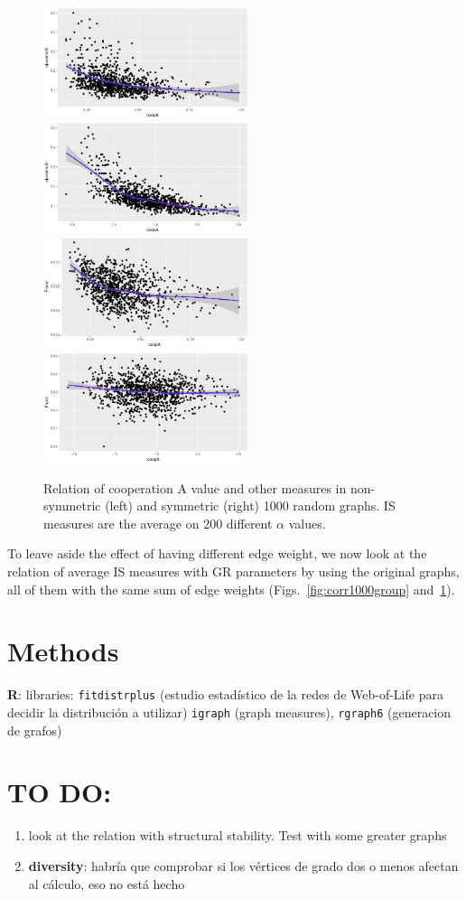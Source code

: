 \documentclass{article}
\begin{document}
\begin{figure}[htbp!]
  \includegraphics[width=6cm]{img/rel1000groupCoopDiam}\quad\quad
  \includegraphics[width=6cm]{img/relS1000groupCoopDiam}\\
  \includegraphics[width=6cm]{img/rel1000groupCoopFrond}\quad\quad
  \includegraphics[width=6cm]{img/relS1000groupCoopFrond}
  \caption{Relation of cooperation A value and other measures in
    non-symmetric (left) and symmetric (right) 1000 random graphs. IS
    measures are the average on 200 different $\alpha$ values.}
  \label{fig:coopAndISGR1000}
\end{figure}

To leave aside the effect of having different edge weight, we now look
at the relation of average IS measures with GR parameters by using the
original graphs, all of them with the same sum of edge weights
(Figs.~\ref{fig:corr1000group} and~\ref{fig:coopAndISGR1000}). 


\section{Methods}

\textbf{R}: libraries: \texttt{fitdistrplus} (estudio estadístico de la redes de Web-of-Life para decidir la distribución a utilizar) \texttt{igraph} (graph measures), \texttt{rgraph6} (generacion de grafos)

\section*{TO DO:} 

\begin{enumerate}
    \item look at the relation with structural stability.
Test with some greater graphs
    \item \textbf{diversity}: habría que comprobar si los vértices de grado dos o menos afectan al cálculo, eso no está hecho

\end{enumerate}
\end{document}
